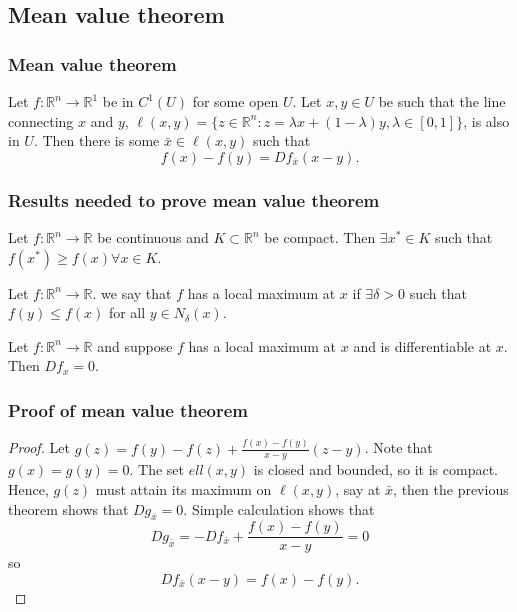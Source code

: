 \documentclass[compress]{beamer}
\def\R{\mathbb{R}}
\renewcommand{\to}{{\rightarrow}}
\begin{document}
\subsection{Mean value theorem}

\begin{frame}
  \frametitle{Mean value theorem}
  \begin{theorem}\label{thm:mvt}
    Let $f:\R^n \to \R^1$ be in $C^1(U)$ for some open $U$. Let $x, y
    \in U$ be such that the line connecting $x$ and $y$, $\ell(x,y) =
    \{z\in \R^n: z = \lambda x + (1-\lambda) y, \lambda \in [0,1]\}$, is
    also in $U$. Then there is some $\bar{x} \in \ell(x,y)$ such that
    \[ f(x) - f(y) = Df_{\bar{x}} (x-y). \]
  \end{theorem}
\end{frame}

\begin{frame}[allowframebreaks]
  \frametitle{Results needed to prove mean value theorem} 
  \begin{theorem}
    Let $f:\R^n \to \R$ be continuous and $K \subset \R^n$ be
    compact. Then $\exists x^* \in K$ such that $f(x^*) \geq f(x)
    \forall x \in K$. 
  \end{theorem}
    
  \begin{definition}
    Let $f: \R^n \to \R$. we say that $f$ has a local maximum at $x$ if
    $\exists \delta > 0$ such that $f(y) \leq f(x)$ for all $y \in
    N_\delta(x)$. 
  \end{definition}

  \begin{theorem}
    Let $f: \R^n \to \R$ and suppose $f$ has a local maximum at $x$ and
    is differentiable at $x$. Then $Df_x = 0$. 
  \end{theorem}
\end{frame}

\begin{frame}\frametitle{Proof of mean value theorem}
  \begin{proof}
    Let $g(z) = f(y) - f(z) + \frac{f(x) - f(y)}{x-y} (z - y)$. Note
    that $g(x) = g(y) = 0$. The set $ell(x,y)$ is closed and bounded,
    so it is compact. Hence, $g(z)$ must attain its maximum on
    $\ell(x,y)$, say at $\bar{x}$, then the previous theorem shows
    that $Dg_{\bar{x}} = 0$. Simple calculation shows that
    \[ Dg_{\bar{x}} = -Df_{\bar{x}} +  \frac{f(x) - f(y)}{x-y} = 0 \]
    so 
    \[ Df_{\bar{x}}(x-y) = f(x) - f(y). \]
  \end{proof}
\end{frame}
\end{document}
